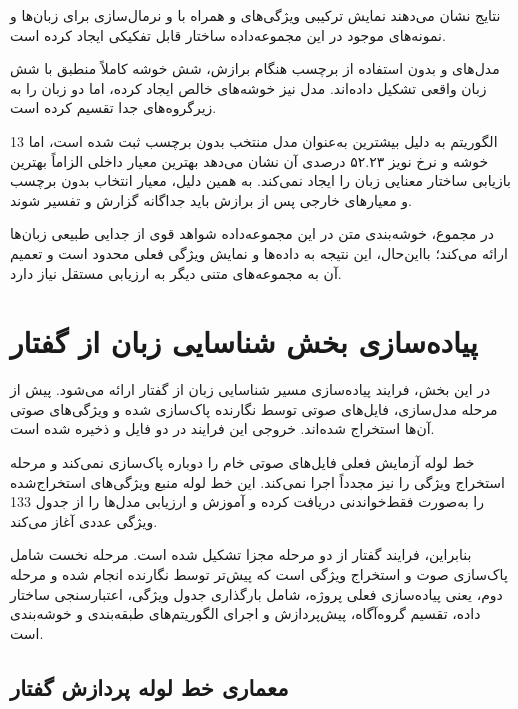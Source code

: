 \documentclass[12pt,a4paper,oneside]{report}
\begin{document}
نتایج نشان می‌دهند نمایش ترکیبی ویژگی‌های
و
همراه با
و نرمال‌سازی
برای زبان‌ها و نمونه‌های موجود در این مجموعه‌داده ساختار قابل تفکیکی ایجاد کرده است.

مدل‌های
و
بدون استفاده از برچسب هنگام برازش، شش خوشه کاملاً منطبق با شش زبان واقعی تشکیل داده‌اند. مدل
نیز خوشه‌های خالص ایجاد کرده، اما دو زبان را به زیرگروه‌های جدا تقسیم کرده است.

الگوریتم
به دلیل بیشترین
به‌عنوان مدل منتخب بدون برچسب ثبت شده است، اما 13 خوشه و نرخ نویز ۵۲.۲۳ درصدی آن نشان می‌دهد بهترین معیار داخلی الزاماً بهترین بازیابی ساختار معنایی زبان را ایجاد نمی‌کند. به همین دلیل، معیار انتخاب بدون برچسب و معیارهای خارجی پس از برازش باید جداگانه گزارش و تفسیر شوند.

در مجموع، خوشه‌بندی متن در این مجموعه‌داده شواهد قوی از جدایی طبیعی زبان‌ها ارائه می‌کند؛ بااین‌حال، این نتیجه به داده‌ها و نمایش ویژگی فعلی محدود است و تعمیم آن به مجموعه‌های متنی دیگر به ارزیابی مستقل نیاز دارد.


\section{پیاده‌سازی بخش شناسایی زبان از گفتار}

در این بخش، فرایند پیاده‌سازی مسیر شناسایی زبان از گفتار ارائه می‌شود. پیش از مرحله مدل‌سازی، فایل‌های صوتی توسط نگارنده پاک‌سازی شده و ویژگی‌های صوتی آن‌ها استخراج شده‌اند. خروجی این فرایند در دو فایل
و
ذخیره شده است.

خط لوله آزمایش فعلی فایل‌های صوتی خام را دوباره پاک‌سازی نمی‌کند و مرحله استخراج ویژگی را نیز مجدداً اجرا نمی‌کند. این خط لوله منبع ویژگی‌های استخراج‌شده را به‌صورت فقط‌خواندنی دریافت کرده و آموزش و ارزیابی مدل‌ها را از جدول 133 ویژگی عددی آغاز می‌کند.

بنابراین، فرایند گفتار از دو مرحله مجزا تشکیل شده است. مرحله نخست شامل پاک‌سازی صوت و استخراج ویژگی است که پیش‌تر توسط نگارنده انجام شده و مرحله دوم، یعنی پیاده‌سازی فعلی پروژه، شامل بارگذاری جدول ویژگی، اعتبارسنجی ساختار داده، تقسیم گروه‌آگاه، پیش‌پردازش و اجرای الگوریتم‌های طبقه‌بندی و خوشه‌بندی است.


\subsection{معماری خط لوله پردازش گفتار}
\end{document}
